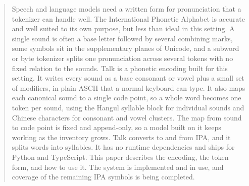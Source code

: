 \begin{abstract}
Speech and language models need a written form for pronunciation that a tokenizer can handle well. The International Phonetic Alphabet is accurate and well suited to its own purpose, but less than ideal in this setting. A single sound is often a base letter followed by several combining marks, some symbols sit in the supplementary planes of Unicode, and a subword or byte tokenizer splits one pronunciation across several tokens with no fixed relation to the sounds. Talk is a phonetic encoding built for this setting. It writes every sound as a base consonant or vowel plus a small set of modifiers, in plain ASCII that a normal keyboard can type. It also maps each canonical sound to a single code point, so a whole word becomes one token per sound, using the Hangul syllable block for individual sounds and Chinese characters for consonant and vowel clusters. The map from sound to code point is fixed and append-only, so a model built on it keeps working as the inventory grows. Talk converts to and from IPA, and it splits words into syllables. It has no runtime dependencies and ships for Python and TypeScript. This paper describes the encoding, the token form, and how to use it. The system is implemented and in use, and coverage of the remaining IPA symbols is being completed.
\end{abstract}
